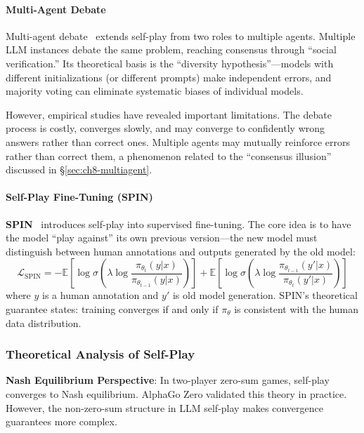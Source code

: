 \paragraph{Multi-Agent Debate}

Multi-agent debate~\citep{madd2023} extends self-play from two roles to multiple agents. Multiple LLM instances debate the same problem, reaching consensus through ``social verification.'' Its theoretical basis is the ``diversity hypothesis''---models with different initializations (or different prompts) make independent errors, and majority voting can eliminate systematic biases of individual models.

However, empirical studies have revealed important limitations. The debate process is costly, converges slowly, and may converge to confidently wrong answers rather than correct ones. Multiple agents may mutually reinforce errors rather than correct them, a phenomenon related to the ``consensus illusion'' discussed in \S\ref{sec:ch8-multiagent}.

\paragraph{Self-Play Fine-Tuning (SPIN)}

\textbf{SPIN}~\citep{spin2024} introduces self-play into supervised fine-tuning. The core idea is to have the model ``play against'' its own previous version---the new model must distinguish between human annotations and outputs generated by the old model:
\begin{equation}
\mathcal{L}_{\mathrm{SPIN}} = -\mathbb{E}\left[\log \sigma\left(\lambda \log \frac{\pi_{\theta_t}(y|x)}{\pi_{\theta_{t-1}}(y|x)}\right)\right] + \mathbb{E}\left[\log \sigma\left(\lambda \log \frac{\pi_{\theta_{t-1}}(y'|x)}{\pi_{\theta_t}(y'|x)}\right)\right]
\label{eq:spin-loss}
\end{equation}
where $y$ is a human annotation and $y'$ is old model generation. SPIN's theoretical guarantee states: training converges if and only if $\pi_\theta$ is consistent with the human data distribution.

\subsubsection{Theoretical Analysis of Self-Play}

\textbf{Nash Equilibrium Perspective}: In two-player zero-sum games, self-play converges to Nash equilibrium. AlphaGo Zero validated this theory in practice. However, the non-zero-sum structure in LLM self-play makes convergence guarantees more complex.

